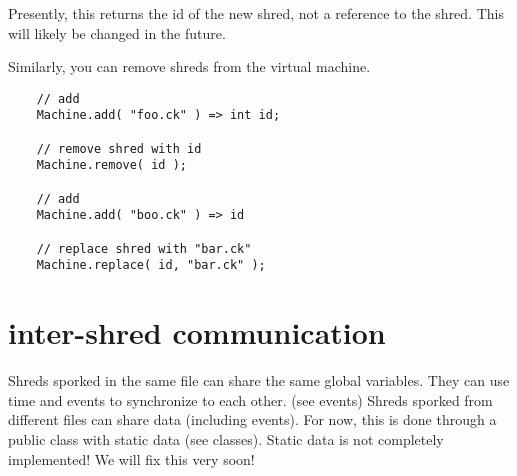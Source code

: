 Presently, this returns the id of the new shred, not a reference to the shred. This will likely be changed in the future.

Similarly, you can remove shreds from the virtual machine.
\begin{verbatim}
    // add
    Machine.add( "foo.ck" ) => int id;

    // remove shred with id
    Machine.remove( id );

    // add
    Machine.add( "boo.ck" ) => id

    // replace shred with "bar.ck"
    Machine.replace( id, "bar.ck" );
\end{verbatim}
 

\section{inter-shred communication}

Shreds sporked in the same file can share the same global variables. They can use time and events to synchronize to each other. (see events) Shreds sporked from different files can share data (including events). For now, this is done through a public class with static data (see  classes). Static data is not completely implemented! We will fix this very soon!